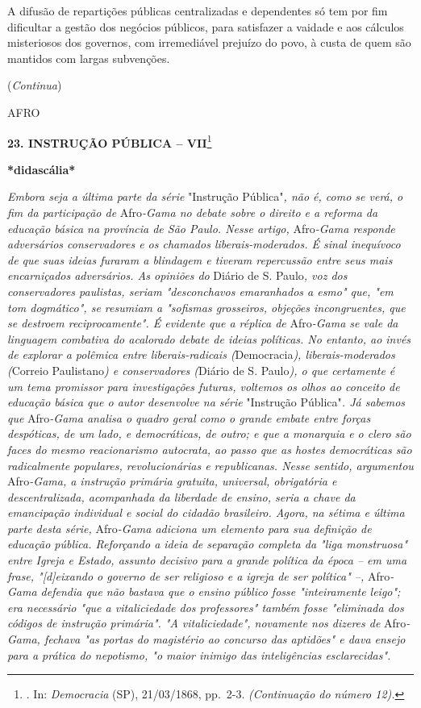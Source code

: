 A difusão de repartições públicas centralizadas e dependentes só tem por
fim dificultar a gestão dos negócios públicos, para satisfazer a vaidade
e aos cálculos misteriosos dos governos, com irremediável prejuízo do
povo, à custa de quem são mantidos com largas subvenções.

(\emph{Continua})

AFRO

\textbf{23. INSTRUÇÃO PÚBLICA -- VII}\footnote{. In: \emph{Democracia}
  (SP), 21/03/1868, pp.~2-3. \emph{(Continuação do número 12).}}

\textbf{*didascália*}

\emph{Embora seja a última parte da série} "Instrução Pública"\emph{,
não é, como se verá, o fim da participação de} Afro\emph{-Gama no debate
sobre o direito e a reforma da educação básica na província de São
Paulo. Nesse artigo,} Afro\emph{-Gama responde adversários conservadores
e os chamados liberais-moderados. É sinal inequívoco de que suas ideias
furaram a blindagem e tiveram repercussão entre seus mais encarniçados
adversários. As opiniões do} Diário de S. Paulo\emph{, voz dos
conservadores paulistas, seriam "desconchavos emaranhados a esmo" que,
"em tom dogmático", se resumiam a "sofismas grosseiros, objeções
incongruentes, que se destroem reciprocamente". É evidente que a réplica
de} Afro\emph{-Gama se vale da linguagem combativa do acalorado debate
de ideias políticas. No entanto, ao invés de explorar a polêmica entre
liberais-radicais (}Democracia\emph{), liberais-moderados (}Correio
Paulistano\emph{) e conservadores (}Diário de S. Paulo\emph{), o que
certamente é um tema promissor para investigações futuras, voltemos os
olhos ao conceito de educação básica que o autor desenvolve na série}
"Instrução Pública"\emph{. Já sabemos que} Afro\emph{-Gama analisa o
quadro geral como o grande embate entre forças despóticas, de um lado, e
democráticas, de outro; e que a monarquia e o clero são faces do mesmo
reacionarismo autocrata, ao passo que as hostes democráticas são
radicalmente populares, revolucionárias e republicanas. Nesse sentido,
argumentou} Afro\emph{-Gama, a instrução primária gratuita, universal,
obrigatória e descentralizada, acompanhada da liberdade de ensino, seria
a chave da emancipação individual e social do cidadão brasileiro. Agora,
na sétima e última parte desta série,} Afro\emph{-Gama adiciona um
elemento para sua definição de educação pública. Reforçando a ideia de
separação completa da "liga monstruosa" entre Igreja e Estado, assunto
decisivo para a grande política da época -- em uma frase,
"{[}d{]}eixando o governo de ser religioso e a igreja de ser política"
--,} Afro\emph{-Gama defendia que não bastava que o ensino público fosse
"inteiramente leigo"; era necessário "que a vitaliciedade dos
professores" também fosse "eliminada dos códigos de instrução primária".
"A vitaliciedade", novamente nos dizeres de} Afro\emph{-Gama, fechava
"as portas do magistério ao concurso das aptidões" e dava ensejo para a
prática do nepotismo, "o maior inimigo das inteligências esclarecidas".}
